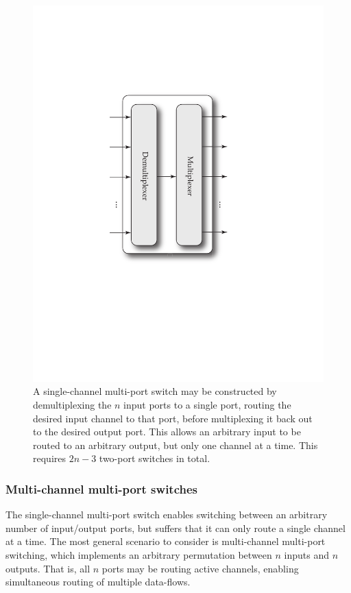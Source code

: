 \documentclass[aps, rmp, twocolumn, amsmath, amssymb, nofootinbib, superscriptaddress, longbibliography, floatfix, table-of-contents, eqsecnum]{revtex4-1}
\begin{document}
\begin{figure}[!htb]
\includegraphics[width=0.75\columnwidth]{single_channel_multi_port_switch}
\caption{A single-channel multi-port switch may be constructed by demultiplexing the $n$ input ports to a single port, routing the desired input channel to that port, before multiplexing it back out to the desired output port. This allows an arbitrary input to be routed to an arbitrary output, but only one channel at a time. This requires \mbox{$2n-3$} two-port switches in total.} \label{fig:single_channel_multi_port_switch} 	
\end{figure}

%
%

\subsubsection{Multi-channel multi-port switches} 

The single-channel multi-port switch enables switching between an arbitrary number of input/output ports, but suffers that it can only route a single channel at a time. The most general scenario to consider is multi-channel multi-port switching, which implements an arbitrary permutation between $n$ inputs and $n$ outputs. That is, all $n$ ports may be routing active channels, enabling simultaneous routing of multiple data-flows.
\end{document}
